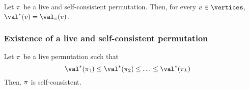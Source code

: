 \begin{corollary}
  \label{stoch:coro}
  Let $\pi$ be a live and self-consistent permutation. Then, for
  every $v \in \vertices$, $\val^*(v) = \val_\perm(v)$.  
\end{corollary}

\subsubsection{Existence of a live and self-consistent permutation}

\begin{lemma}
  \label{stoch:lemma:croissant}
  Let $\pi$ be a live permutation such that
  \[
  \val^*(\perm_1) \le \val^*(\perm_2) \le \ldots \le \val^*(\perm_k)
  \]
  Then, $\pi$ is self-consistent.
\end{lemma}

